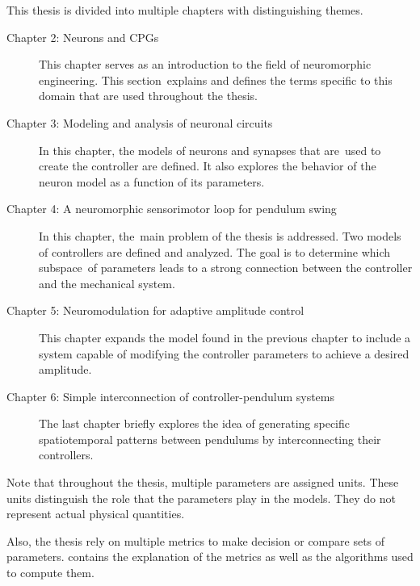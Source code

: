 This thesis is divided into multiple chapters with distinguishing themes.
\begin{description}
 \item[Chapter 2: Neurons and CPGs] This chapter serves as an introduction to the field of neuromorphic engineering. This section explains and defines the terms specific to this domain that are used throughout the thesis.
 \item[Chapter 3: Modeling and analysis of neuronal circuits] In this chapter, the models of neurons and synapses that are used to create the controller are defined. It also explores the behavior of the neuron model as a function of its parameters.
 \item[Chapter 4: A neuromorphic sensorimotor loop for pendulum swing] In this chapter, the main problem of the thesis is addressed. Two models of controllers are defined and analyzed. The goal is to determine which subspace of parameters leads to a strong connection between the controller and the mechanical system.
 \item[Chapter 5: Neuromodulation for adaptive amplitude control] This chapter expands the model found in the previous chapter to include a system capable of modifying the controller parameters to achieve a desired amplitude.
 \item[Chapter 6: Simple interconnection of controller-pendulum systems] The last chapter briefly explores the idea of generating specific spatiotemporal patterns between pendulums by interconnecting their controllers.
\end{description}
Note that throughout the thesis, multiple parameters are assigned units. These units distinguish the role that the parameters play in the models. They do not represent actual physical quantities. 

Also, the thesis rely on multiple metrics to make decision or compare sets of parameters.  contains the explanation of the metrics as well as the algorithms used to compute them.

\iffalse
To reuse an somewhat old but striking example, in 2016 AlphaGO bested one of the best human go player. Yet, AlphaGO consumed around \qty{1}{\mega\watt} to accomplish this feat while the brain of Lee Sedol, the human player, only consumed around \qty{20}{\watt}. And, in addition to playing the game, Lee's brain also processed all its sensory inputs, controlled its arm to make the moves on the board and continued regulating the equilibrium of its body. Better yet, after the game, he was able to go home and perform activities that are fundamentally different from playing go.

This energy gap between machine and human is explained by the fundamental difference in their computational architecture. The traditional architecture uses synchronized computing steps with memory separated from the computing. Conversely, in a neuronal net, the computing is done completely asynchronously and the memory of the systems is integrated in the computing since it is represented by the dynamical nature of the neurons.
\fi
